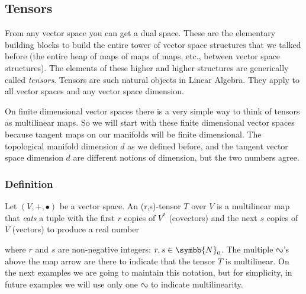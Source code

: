 \subsection{Tensors}
From any vector space you can get a dual space. These are the elementary building blocks to build
the entire tower of vector space structures that we talked before (the entire heap of maps of maps
of maps, etc., between vector space structures).
The elements of these higher and higher structures are generically called \emph{tensors}.
Tensors are such natural objects in Linear Algebra. They apply to all vector spaces and
any vector space dimension\footnotemark{}.

On finite dimensional vector spaces there is a very simple way to think of tensors as multilinear
maps. So we will start with these finite dimensional vector spaces because tangent maps on our
manifolds will be finite dimensional.
The topological manifold dimension $d$ as we defined before, and the tangent vector space dimension
$d$ are different notions of dimension, but the two numbers agree.

\subsubsection{Definition}
Let $(V,+,\vysmblkcircle)$ be a vector space. An (r,s)-tensor $T$ over $V$ is a multilinear map
that \emph{eats} a tuple with the first $r$ copies of $V^\ast$ (covectors) and the next $s$ copies of
$V$ (vectors) to produce a real number
\begin{center}
\end{center}
where $r$ and $s$ are non-negative integers: $r,s\in\symbb{N}_0$. The multiple $\invlazys$'s
above the map arrow are there to indicate that the tensor $T$ is multilinear.
On the next examples we are going to maintain this notation, but for simplicity,  in future
examples we will use only one $\invlazys$ to indicate multilinearity.

